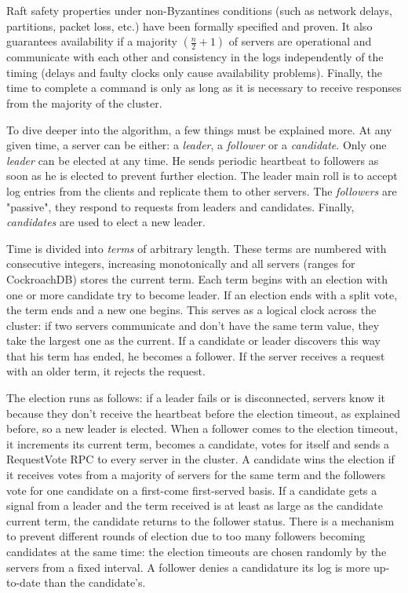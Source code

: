 Raft safety properties under non-Byzantines conditions (such as network delays, partitions, packet loss, etc.) have been formally specified and proven. It also guarantees availability if a majority $(\frac{n}{2} + 1)$ of servers are operational and communicate with each other and consistency in the logs independently of the timing (delays and faulty clocks only cause availability problems). Finally, the time to complete a command is only as long as it is necessary to receive responses from the majority of the cluster.

To dive deeper into the algorithm, a few things must be explained more. At any given time, a server can be either: a \emph{leader}, a \emph{follower} or a \emph{candidate}. Only one \emph{leader} can be elected at any time. He sends periodic heartbeat to followers as soon as he is elected to prevent further election. The leader main roll is to accept log entries from the clients and replicate them to other servers. The \emph{followers} are "passive", they respond to requests from leaders and candidates. Finally, \emph{candidates} are used to elect a new leader.

Time is divided into \emph{terms} of arbitrary length. These terms are numbered with consecutive integers, increasing monotonically and all servers (ranges for CockroachDB) stores the current term. Each term begins with an election with one or more candidate try to become leader. If an election ends with a split vote, the term ends and a new one begins. This serves as a logical clock across the cluster: if two servers communicate and don't have the same term value, they take the largest one as the current. If a candidate or leader discovers this way that his term has ended, he becomes a follower. If the server receives a request with an older term, it rejects the request.

The election runs as follows: if a leader fails or is disconnected, servers know it because they don't receive the heartbeat before the election timeout, as explained before, so a new leader is elected. When a follower comes to the election timeout, it increments its current term, becomes a candidate, votes for itself and sends a RequestVote RPC to every server in the cluster. A candidate wins the election if it receives votes from a majority of servers for the same term and the followers vote for one candidate on a first-come first-served basis. If a candidate gets a signal from a leader and the term received is at least as large as the candidate current term, the candidate returns to the follower status. There is a mechanism to prevent different rounds of election due to too many followers becoming candidates at the same time: the election timeouts are chosen randomly by the servers from a fixed interval. A follower denies a candidature its log is more up-to-date than the candidate's.

